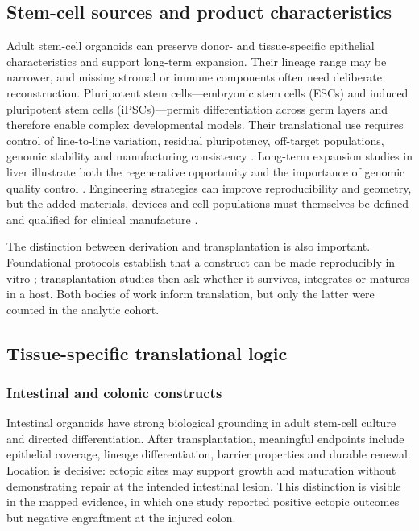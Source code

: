 \documentclass[11pt,a4paper]{article}
\begin{document}
\subsection{Stem-cell sources and product characteristics}

Adult stem-cell organoids can preserve donor- and tissue-specific epithelial characteristics and support long-term expansion. Their lineage range may be narrower, and missing stromal or immune components often need deliberate reconstruction. Pluripotent stem cells---embryonic stem cells (ESCs) and induced pluripotent stem cells (iPSCs)---permit differentiation across germ layers and therefore enable complex developmental models. Their translational use requires control of line-to-line variation, residual pluripotency, off-target populations, genomic stability and manufacturing consistency \citep{bartfeld2017,rossi2018,kim2020,jensen2023}. Long-term expansion studies in liver illustrate both the regenerative opportunity and the importance of genomic quality control \citep{huch2015}. Engineering strategies can improve reproducibility and geometry, but the added materials, devices and cell populations must themselves be defined and qualified for clinical manufacture \citep{brassard2019,park2024}.

The distinction between derivation and transplantation is also important. Foundational protocols establish that a construct can be made reproducibly in vitro \citep{spence2011,takasato2015,morizane2015}; transplantation studies then ask whether it survives, integrates or matures in a host. Both bodies of work inform translation, but only the latter were counted in the analytic cohort.

\subsection{Tissue-specific translational logic}

\subsubsection{Intestinal and colonic constructs}

Intestinal organoids have strong biological grounding in adult stem-cell culture and directed differentiation. After transplantation, meaningful endpoints include epithelial coverage, lineage differentiation, barrier properties and durable renewal. Location is decisive: ectopic sites may support growth and maturation without demonstrating repair at the intended intestinal lesion. This distinction is visible in the mapped evidence, in which one study reported positive ectopic outcomes but negative engraftment at the injured colon.
\end{document}
